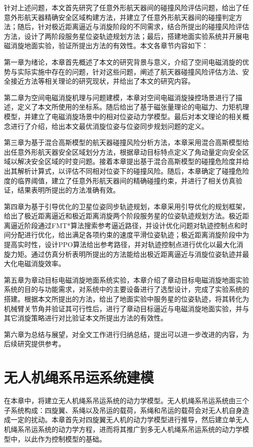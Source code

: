 \documentclass[lang=chs, degree=master, blindreview=false, winfonts=true]{yanputhesis}
\begin{document}
针对上述问题，本文首先研究了任意外形航天器间的碰撞风险评估问题，给出了任意外形航天器精确安全区域构建方法，并建立了任意外形航天器间的碰撞判定方法；随后，针对极近距离逼近与消旋阶段的不同需求，结合所提出的碰撞风险评估方法，设计了两阶段服务星位姿轨迹规划方法；最后，搭建地面实验系统并开展电磁消旋地面实验，验证所提出方法的有效性。本文各章节内容如下：

第一章为绪论，本章首先概述了本文的研究背景与意义，介绍了空间电磁消旋的优势与实际实施中存在的问题，针对这些问题，阐述了航天器碰撞风险评估方法、安全接近方法等相关理论的研究现状，并给出了本文的研究内容。

第二章为空间电磁消旋机理与问题建模，本章对空间电磁消旋操控场景进行了描述，定义了本文所使用的坐标系。随后给出了基于磁张量理论的电磁力、力矩机理模型，并建立了电磁消旋场景中的相对位姿动力学模型。最后对本文理论的相关概念进行了介绍，给出本文最优消旋位姿与位姿同步规划问题的定义。

第三章为基于混合高斯模型的航天器碰撞风险分析方法，本章采用混合高斯模型给出任意外形航天器安全区域划分方法，根据章动目标特点定义了角动量定向安全区域以解决安全区域的时变问题。接着本章提出基于混合高斯模型的碰撞危险度并给出其解析计算式，以评估不同相对位姿下的碰撞风险。随后，本章确定了碰撞危险度的临界阈值，建立了任意外形航天器间的精确碰撞约束，并进行了相关仿真验证，结果表明所提出的方法准确有效。

第四章为基于引导优化的卫星位姿同步轨迹规划，本章采用引导优化的规划框架，给出了极近距离逼近和极近距离消旋两个阶段服务星的位姿轨迹规划方法。极近距离逼近阶段通过FMT*算法搜索参考逼近路径，并设计优化问题对轨迹控制点和时间分配进行优化，给出满足各项约束的速度平滑位姿轨迹；极近距离消旋阶段中为提高实时性，设计PPO算法给出参考路径，并对轨迹控制点进行优化以最大化消旋力矩。通过仿真分析表明所提出的方法能给出极近距离逼近与消旋位姿轨迹并最大化电磁消旋效率。

第五章为章动目标电磁消旋地面系统实验，本章介绍了章动目标电磁消旋地面实验系统的目的与功能需求，对系统中的主要设备进行了选型设计，完成了实验系统的搭建。根据本文所提出的方法，给出了地面实验中服务星的位姿轨迹，将其转化为机械臂关节角并验证其可行性后，进行了章动目标逼近与电磁消旋地面实验，并与其它消旋策略进行对比验证本文所提出方法的有效性。

第六章为总结与展望，对全文工作进行归纳总结，提出可以进一步改进的内容，为后续研究提供参考。



\cleardoublepage

\chapter{无人机绳系吊运系统建模}
在本章中，将建立无人机绳系吊运系统的动力学模型。无人机绳系吊运系统由三个子系统构成：四旋翼、系绳以及吊运的载荷，系绳和吊运的载荷会对无人机自身造成一定的扰动。本章首先对四旋翼无人机的动力学模型进行推导，然后建立单无人机绳系吊运系统的动力学方程，进而将其推广到多无人机绳系吊运系统的动力学模型中，以此作为控制模型的基础。
\end{document}
